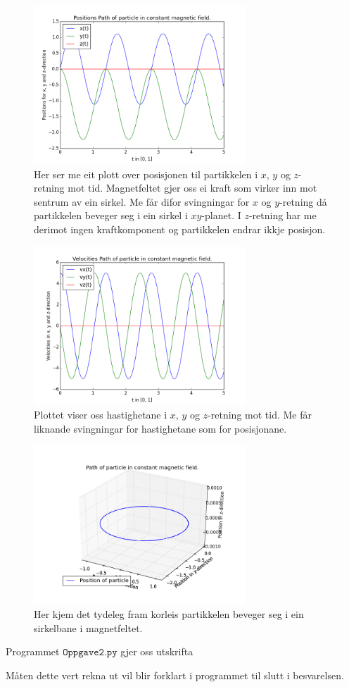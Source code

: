 \documentclass[11pt, a4paper]{article}
\begin{document}
  \begin{figure}[H]
    \centering
    \includegraphics[width=300px]{2A1.png}
    \caption{Her ser me eit plott over posisjonen til partikkelen i $x$, $y$ og $z$-retning mot tid. Magnetfeltet gjer oss ei kraft som virker inn mot sentrum av ein sirkel. 
    Me får difor svingningar for $x$ og $y$-retning då partikkelen beveger seg i ein sirkel i $xy$-planet. I $z$-retning har me derimot ingen kraftkomponent og partikkelen endrar ikkje 
    posisjon.}
  \end{figure}

  \begin{figure}[H]
    \centering
    \includegraphics[width=300px]{2A2.png}
    \caption{Plottet viser oss hastighetane i $x$, $y$ og $z$-retning mot tid. Me får liknande svingningar for hastighetane som for posisjonane.}
  \end{figure}

  \begin{figure}[H]
    \centering
    \includegraphics[width=300px]{2A3.png}
    \caption{Her kjem det tydeleg fram korleis partikkelen beveger seg i ein sirkelbane i magnetfeltet.}
  \end{figure}
  Programmet $\texttt{Oppgave2.py}$ gjer oss utskrifta
  \begin{center}
    
  \end{center}
  Måten dette vert rekna ut vil blir forklart i programmet til slutt i besvarelsen. \\ \\
\end{document}
